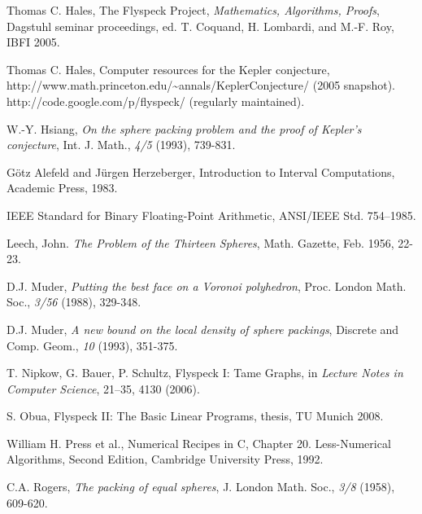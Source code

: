 \documentclass{llncs}
\begin{document}
\begin{thebibliography}{HeHa94}
	  Thomas C. Hales, The Flyspeck Project, 
{\it Mathematics, Algorithms, Proofs}, Dagstuhl seminar proceedings, 
ed. T. Coquand, H. Lombardi, and M.-F. Roy,
IBFI 2005.
	






 Thomas C. Hales, Computer resources for the Kepler conjecture, \hfill\break
    http://www.math.princeton.edu/\~\!annals/KeplerConjecture/ (2005 snapshot).
    http://code.google.com/p/flyspeck/ (regularly maintained).

 W.-Y. Hsiang, {\it On the sphere packing problem and
the proof of Kepler's conjecture}, Int. J. Math., \emph{4/5} (1993),
739-831.

 G\"otz Alefeld and J\"urgen Herzeberger,
Introduction to Interval Computations, Academic Press, 1983.


 IEEE Standard for Binary Floating-Point Arithmetic,
ANSI/IEEE Std. 754--1985.

 Leech, John.  {\it The Problem of the Thirteen
Spheres}, Math. Gazette, Feb. 1956, 22-23.

 D.J. Muder, {\it Putting the best face on a Voronoi
polyhedron}, Proc. London Math. Soc., \emph{3/56} (1988), 329-348.

 D.J. Muder, {\it A new bound on the local density of
sphere packings}, Discrete and Comp. Geom., \emph{10} (1993), 351-375.

  T. Nipkow, G. Bauer, P. Schultz, Flyspeck I: Tame Graphs, in
{\it Lecture Notes in Computer Science}, 21--35, 4130 (2006). 

  S. Obua, Flyspeck II: The Basic Linear Programs,
thesis, TU Munich 2008.

 William H. Press et al., Numerical Recipes in C,
Chapter 20. Less-Numerical Algorithms, Second Edition, Cambridge
University Press, 1992.

 C.A. Rogers, {\it The packing of equal spheres},
J. London Math. Soc., \emph{3/8} (1958), 609-620.




\end{thebibliography}
\end{document}
